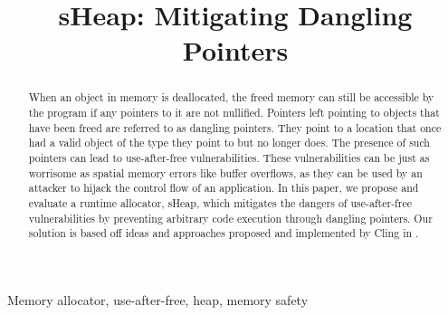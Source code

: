 \documentclass[conference]{IEEEtran}
\begin{document}
\title{sHeap: Mitigating Dangling Pointers\\}

\author{
\and
{}
\and
{}
}

\maketitle

\begin{abstract}
When an object in memory is deallocated, the freed memory can still be accessible 
by the program if any pointers to it are not nullified. Pointers left pointing 
to objects that have been freed are referred to as dangling pointers. They 
point to a location that once had a valid object of the type they point to but 
no longer does. The presence of such pointers can lead to use-after-free 
vulnerabilities. These vulnerabilities can be just as worrisome as spatial 
memory errors like buffer overflows, as they can be used by an attacker to 
hijack the control flow of an application. In this paper, we propose and evaluate 
a runtime allocator, sHeap, which mitigates the dangers of use-after-free 
vulnerabilities by preventing arbitrary code execution through dangling 
pointers. Our solution is based off ideas and approaches proposed and 
implemented by Cling in \cite{b1}.
\end{abstract}

\begin{IEEEkeywords}
Memory allocator, use-after-free, heap, memory safety
\end{IEEEkeywords}
\end{document}
